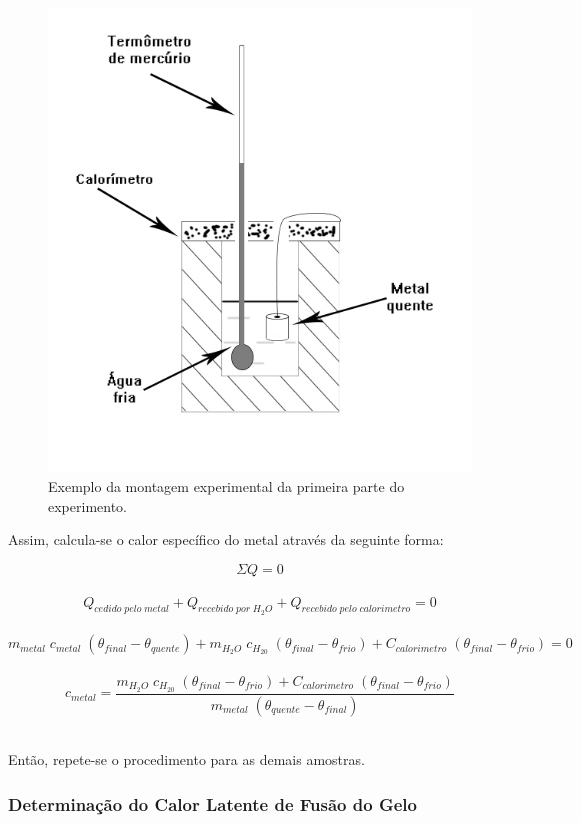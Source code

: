 \documentclass[12pt,a4paper]{article}
\begin{document}
\begin{figure}[!htbp]
\centering
\includegraphics[scale=0.45]{Fig6b1.jpg}
\caption{Exemplo da montagem experimental da primeira parte do experimento.}
\label{CalorMetais}
\end{figure}

Assim, calcula-se o calor específico do metal através da seguinte forma:

$$\Sigma Q = 0$$\
$$Q_{cedido\; pelo\; metal} + Q_{recebido\; por\; H_2O} + Q_{recebido\; pelo\; calorimetro} = 0$$\
$$m_{metal} \; c_{metal} \; (\theta_{final} - \theta_{quente}) + m_{H_2O} \; c_{H_20} \;  (\theta_{final} - \theta_{frio}) + C_{calorimetro} \; (\theta_{final} - \theta_{frio}) = 0$$\
$$c_{metal} = \frac{m_{H_2O} \; c_{H_20} \;  (\theta_{final} - \theta_{frio}) + C_{calorimetro} \; (\theta_{final} - \theta_{frio})}{m_{metal} \;(\theta_{quente} - \theta_{final})}$$\

Então, repete-se o procedimento para as demais amostras.

\subsubsection{Determinação do Calor Latente de Fusão do Gelo}
\end{document}

